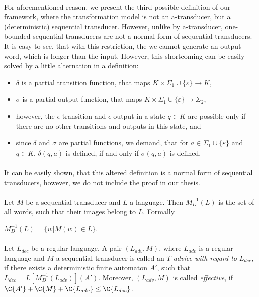 \paragraph{}
For aforementioned reason, we present the third possible definition of our framework, where the transformation model is not an a-transducer, but a (deterministic) sequential transducer. However, unlike by a-transducer, one-bounded sequential transducers are not a normal form of sequential transducers. It is easy to see, that with this restriction, the we cannot generate an output word, which is longer than the input. However, this shortcoming can be easily solved by a little alternation in a definition:
\begin{itemize}
\item $\delta$ is a partial transition function, that maps $K \times \Sigma_{1} \cup \{\varepsilon\} \rightarrow K$,
\item $\sigma$ is a partial output function, that maps $K \times \Sigma_{1} \cup \{\varepsilon\} \rightarrow \Sigma_{2}$,
\item however, the $\epsilon$-transition and $\epsilon$-output in a state $q \in K$ are possible only if there are no other transitions and outputs in this state, and
\item since $\delta$ and $\sigma$ are partial functions, we demand, that for $a \in \Sigma_1 \cup \{\varepsilon\}$ and $q \in K$, $\delta(q,a)$ is defined, if and only if $\sigma(q,a)$ is defined.
\end{itemize}

\paragraph{}
It can be easily shown, that this altered definition is a normal form of sequential transducers, however, we do not include the proof in our thesis.

\paragraph{}
\cdefinicia Let $M$ be a sequential transducer and $L$ a language. Then $M_{D}^{-1}(L)$ is the set of all words, such that their images belong to $L$. Formally \\
\centerline{$M_{D}^{-1}(L) = \{ w | M(w) \in L \}$.}

\paragraph{}
\cdefinicia Let $L_{dec}$ be a regular language. A pair $(L_{adv}, M)$, where $L_{adv}$ is a regular language and $M$ a sequential transducer is called an \emph{$T$-advice with regard to $L_{dec}$}, if there exists a deterministic finite automaton $A'$, such that $L_{dec} = L[M_{D}^{-1}(L_{adv})](A')$. Moreover, $(L_{adv}, M)$ is called \emph{effective}, if $\C{A'} + \C{M} + \C{L_{adv}} \leq	 \C{L_{dec}}$.

